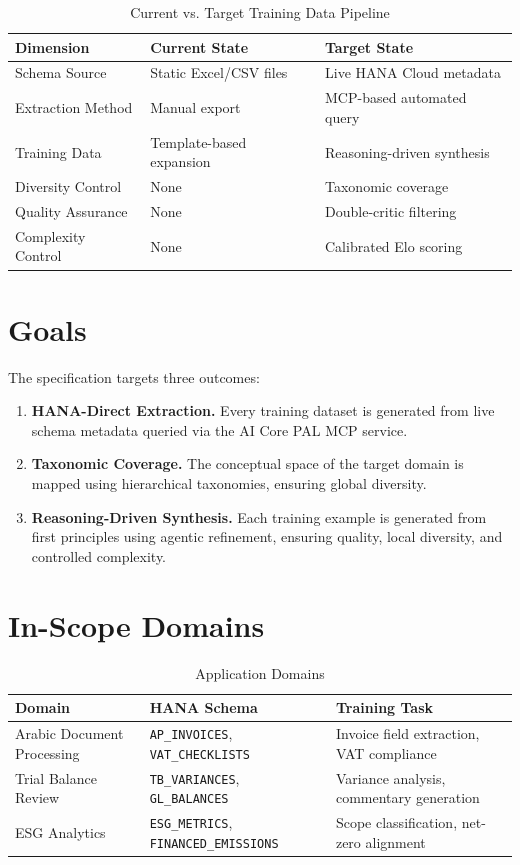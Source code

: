 \documentclass[12pt,a4paper,twoside]{report}
\begin{document}
\begin{table}[H]
\centering
\caption{Current vs. Target Training Data Pipeline}
\label{tab:gap-analysis}
\begin{tabularx}{\textwidth}{lXX}
\toprule
\textbf{Dimension} & \textbf{Current State} & \textbf{Target State} \\
\midrule
Schema Source & Static Excel/CSV files & Live HANA Cloud metadata \\
Extraction Method & Manual export & MCP-based automated query \\
Training Data & Template-based expansion & Reasoning-driven synthesis \\
Diversity Control & None & Taxonomic coverage \\
Quality Assurance & None & Double-critic filtering \\
Complexity Control & None & Calibrated Elo scoring \\
\bottomrule
\end{tabularx}
\end{table}

\section{Goals}

The specification targets three outcomes:

\begin{enumerate}[nosep]
\item \textbf{HANA-Direct Extraction.} Every training dataset is generated from live
schema metadata queried via the AI Core PAL MCP service.
\item \textbf{Taxonomic Coverage.} The conceptual space of the target domain is mapped
using hierarchical taxonomies, ensuring global diversity.
\item \textbf{Reasoning-Driven Synthesis.} Each training example is generated from
first principles using agentic refinement, ensuring quality, local diversity,
and controlled complexity.
\end{enumerate}

\section{In-Scope Domains}

\begin{table}[H]
\centering
\caption{Application Domains}
\label{tab:domains}
\begin{tabularx}{\textwidth}{llX}
\toprule
\textbf{Domain} & \textbf{HANA Schema} & \textbf{Training Task} \\
\midrule
Arabic Document Processing & \texttt{AP\_INVOICES}, \texttt{VAT\_CHECKLISTS} & Invoice field extraction, VAT compliance \\
Trial Balance Review & \texttt{TB\_VARIANCES}, \texttt{GL\_BALANCES} & Variance analysis, commentary generation \\
ESG Analytics & \texttt{ESG\_METRICS}, \texttt{FINANCED\_EMISSIONS} & Scope classification, net-zero alignment \\
\bottomrule
\end{tabularx}
\end{table}
\end{document}
